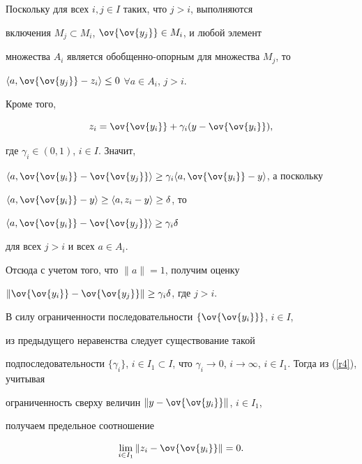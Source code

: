 \begin{pf}


Поскольку для всех $i, j \in I$ таких, что $j>i$, выполняются


включения $M_j\subset M_i$, $\ov{\ov{y_j}} \in M_i$, и любой элемент


множества $A_i$ является обобщенно-опорным для множества $M_j$, то


$\la a, \ov{\ov{y_j}} -z_i \ra \le 0$ $\forall a\in A_i$, $j>i$.


Кроме того,




\begin{equation} \label{r4}


z_i= \ov{\ov{y_i}} + \gamma_i (y-\ov{\ov{y_i}}),


\end{equation}


%


где $\gamma_i \in (0,1)$, $i\in I$. Значит,


$\la a, \ov{\ov{y_i}} -\ov{\ov{y_j}} \ra\ge


\gamma_i \la a, \ov{\ov{y_i}} -y \ra $, а поскольку


$\la a, \ov{\ov{y_i}} -y \ra \ge


\la a, z_i -y \ra \ge \delta$, то


$\la a, \ov{\ov{y_i}} -\ov{\ov{y_j}} \ra \ge \gamma_i \delta$


для всех $j>i$ и всех $a\in A_i$.


Отсюда с учетом того, что $\|a\|=1$, получим оценку


$\| \ov{\ov{y_i}} -\ov{\ov{y_j}} \| \ge \gamma_i \delta$, где $j>i$.


В силу ограниченности последовательности $\{ \ov{\ov{y_i}}\}$, $i\in I$,


из предыдущего неравенства следует существование такой


подпоследовательности $\{ \gamma_i \}$, $i\in I_1 \subset I$, что $\gamma_i


\to 0$, $i\to \infty$, $i\in I_1$. Тогда из (\ref{r4}), учитывая


ограниченность сверху величин $\| y- \ov{\ov{y_i}} \|$, $i\in I_1$,


получаем предельное соотношение




\begin{equation} \label{r5}


\lim_{i\in I_1} \| z_i - \ov{\ov{y_i}}\|=0.



\end{equation}
\end{pf}
